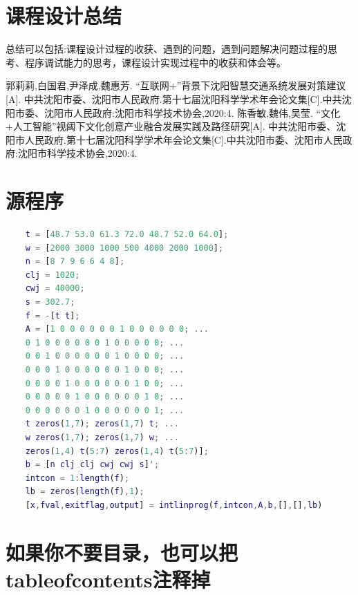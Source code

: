 \documentclass{ctexart}
\begin{document}
\section{课程设计总结}

总结可以包括:课程设计过程的收获、遇到的问题，遇到问题解决问题过程的思考、程序调试能力的思考，课程设计实现过程中的收获和体会等。

\begin{thebibliography}{20}
	郭莉莉,白国君,尹泽成,魏惠芳. “互联网+”背景下沈阳智慧交通系统发展对策建议[A]. 中共沈阳市委、沈阳市人民政府.第十七届沈阳科学学术年会论文集[C].中共沈阳市委、沈阳市人民政府:沈阳市科学技术协会,2020:4.
	陈香敏,魏伟,吴莹. “文化+人工智能”视阈下文化创意产业融合发展实践及路径研究[A]. 中共沈阳市委、沈阳市人民政府.第十七届沈阳科学学术年会论文集[C].中共沈阳市委、沈阳市人民政府:沈阳市科学技术协会,2020:4.
\end{thebibliography}

\section{源程序}

\begin{lstlisting}[language=matlab,caption={求解问题1的MatLab代码}]
	% 代码！也可以写在这里！
	t = [48.7 53.0 61.3 72.0 48.7 52.0 64.0];
	w = [2000 3000 1000 500 4000 2000 1000];
	n = [8 7 9 6 6 4 8];
	clj = 1020;
	cwj = 40000;
	s = 302.7;
	f = -[t t];
	A = [1 0 0 0 0 0 0 1 0 0 0 0 0 0; ...
	0 1 0 0 0 0 0 0 1 0 0 0 0 0; ...
	0 0 1 0 0 0 0 0 0 1 0 0 0 0; ...
	0 0 0 1 0 0 0 0 0 0 1 0 0 0; ...
	0 0 0 0 1 0 0 0 0 0 0 1 0 0; ...
	0 0 0 0 0 1 0 0 0 0 0 0 1 0; ...
	0 0 0 0 0 0 1 0 0 0 0 0 0 1; ...
	t zeros(1,7); zeros(1,7) t; ...
	w zeros(1,7); zeros(1,7) w; ...
	zeros(1,4) t(5:7) zeros(1,4) t(5:7)];
	b = [n clj clj cwj cwj s]';
	intcon = 1:length(f);
	lb = zeros(length(f),1);
	[x,fval,exitflag,output] = intlinprog(f,intcon,A,b,[],[],lb)
\end{lstlisting}

\section{如果你不要目录，也可以把tableofcontents注释掉}
\end{document}
